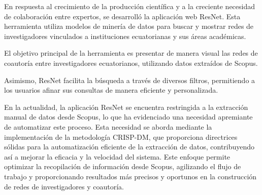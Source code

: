 
En respuesta al crecimiento de la producción científica y a la creciente necesidad de colaboración entre expertos, se desarrolló la aplicación web ResNet. Esta herramienta utiliza modelos de minería de datos para buscar y mostrar redes de investigadores vinculados a instituciones ecuatorianas y sus áreas académicas.


El objetivo principal de la herramienta es presentar de manera visual las redes de coautoría entre investigadores ecuatorianos, utilizando datos extraídos de Scopus. 

Asimismo, ResNet facilita la búsqueda a través de diversos filtros, permitiendo a los usuarios afinar sus consultas de manera eficiente y personalizada.

En la actualidad, la aplicación ResNet se encuentra restringida a la extracción manual de datos desde Scopus, lo que ha evidenciado una necesidad apremiante de automatizar este proceso. Esta necesidad se aborda mediante la implementación de la metodología CRISP-DM, que proporciona directrices sólidas para la automatización eficiente de la extracción de datos, contribuyendo así a mejorar la eficacia y la velocidad del sistema. Este enfoque permite optimizar la recopilación de información desde Scopus, agilizando el flujo de trabajo y proporcionando resultados más precisos y oportunos en la construcción de redes de investigadores y coautoría.